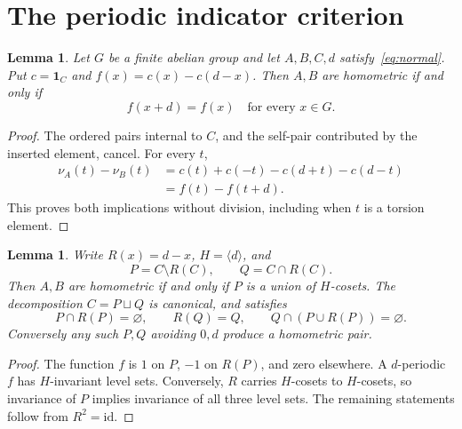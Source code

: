 \documentclass[11pt]{article}
\newtheorem{lemma}[theorem]{Lemma}
\newcommand{\ind}{\mathbf 1}
\begin{document}
\section{The periodic indicator criterion}
\begin{lemma}\label{lem:criterion}
Let $G$ be a finite abelian group and let $A,B,C,d$ satisfy~\eqref{eq:normal}. Put $c=\ind_C$ and $f(x)=c(x)-c(d-x)$. Then $A,B$ are homometric if and only if
\[
 f(x+d)=f(x)\quad\text{for every }x\in G.
\]
\end{lemma}
\begin{proof}
The ordered pairs internal to $C$, and the self-pair contributed by the inserted element, cancel. For every $t$,
\begin{align*}
\nu_A(t)-\nu_B(t)
 &=c(t)+c(-t)-c(d+t)-c(d-t)\\
 &=f(t)-f(t+d).
\end{align*}
This proves both implications without division, including when $t$ is a torsion element.
\end{proof}

\begin{lemma}\label{lem:decomp}
Write $R(x)=d-x$, $H=\langle d\rangle$, and
\[
 P=C\setminus R(C),\qquad Q=C\cap R(C).
\]
Then $A,B$ are homometric if and only if $P$ is a union of $H$-cosets. The decomposition $C=P\sqcup Q$ is canonical, and satisfies
\[
 P\cap R(P)=\varnothing,\qquad R(Q)=Q,\qquad
 Q\cap(P\cup R(P))=\varnothing.
\]
Conversely any such $P,Q$ avoiding $0,d$ produce a homometric pair.
\end{lemma}
\begin{proof}
The function $f$ is $1$ on $P$, $-1$ on $R(P)$, and zero elsewhere. A $d$-periodic $f$ has $H$-invariant level sets. Conversely, $R$ carries $H$-cosets to $H$-cosets, so invariance of $P$ implies invariance of all three level sets. The remaining statements follow from $R^2=\mathrm{id}$.
\end{proof}
\end{document}

